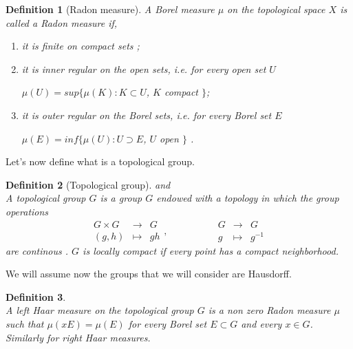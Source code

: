 \documentclass[a4paper,11pt]{article} %
\numberwithin{equation}{section} %
\numberwithin{figure}{section} %
\newtheorem{dfn}{Definition}
\begin{document}
\begin{dfn}[Radon measure] \label{Radon} 
A Borel measure $\mu$ on the topological space $X$ is called a Radon measure if, 
\begin{enumerate}
\item it is finite on compact sets \cite[Def. 1.19, p. 14]{Moretti2012};
\item it is inner regular \cite[Def. 1.42, p. 20]{Moretti2012} on the open sets, i.e. for every open set $U$ 
\begin{center}
$\mu(U) = sup\big\{\mu(K) : K \subset U$, $K$ compact $\big\}$;
\end{center}
\item it is outer regular \cite[Def. 1.42, p. 20]{Moretti2012} on the Borel sets, i.e. for every Borel set $E$
\begin{center}
$\mu(E) = inf\big\{\mu(U) : U \supset E$, $U$ open $\big\}$ .
\end{center}
\end{enumerate}
\end{dfn}

Let's now define what is a topological group.

\begin{dfn}[Topological group] \cite[Def. 3.1, p.4]{Yvette2005} and \cite[Def. 12.28, p. 552]{Moretti2012} \\
A topological group $G$ is a group $G$ \cite[A.2, p. 698]{Moretti2012} endowed with a topology in which the group operations
\begin{equation}
\begin{array}{lll}
G \times G & \to & G\\
(g,h) & \mapsto & gh
\end{array}
,\hspace{2cm}
\begin{array}{lll}
G & \to & G\\
g & \mapsto & g^{-1}
\end{array}
\end{equation}
are continous \cite[Def. 1.16, p. 13]{Moretti2012}. $G$ is locally compact if every point has a compact neighborhood. 
\end{dfn}

We will assume now the groups that we will consider are Hausdorff.

\begin{dfn} \cite[Ex. 12.29, (5), p. 553]{Moretti2012} \\
A left Haar measure on the topological group $G$ is a non zero Radon measure $\mu$ such that $\mu(xE)=\mu(E)$ for every Borel set $E\subset G$ and every $x\in G$. Similarly for right Haar measures.
\end{dfn}
\end{document}
